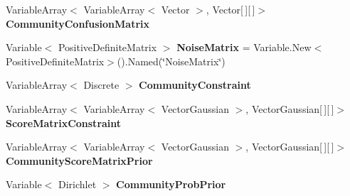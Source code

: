 \begin{DoxyCompactItemize}
\item 
\hypertarget{class_crowdsourcing_models_1_1_c_b_c_c_aa92337a4041cf062fb346a5321c7fa45}{}Variable\+Array$<$ Variable\+Array$<$ Vector $>$, Vector\mbox{[}$\,$\mbox{]}\mbox{[}$\,$\mbox{]}$>$ {\bfseries Community\+Confusion\+Matrix}\label{class_crowdsourcing_models_1_1_c_b_c_c_aa92337a4041cf062fb346a5321c7fa45}

\item 
\hypertarget{class_crowdsourcing_models_1_1_c_b_c_c_a4976a87b7cdd818f300d77d465372238}{}Variable$<$ Positive\+Definite\+Matrix $>$ {\bfseries Noise\+Matrix} = Variable.\+New$<$Positive\+Definite\+Matrix$>$().Named(\char`\"{}Noise\+Matrix\char`\"{})\label{class_crowdsourcing_models_1_1_c_b_c_c_a4976a87b7cdd818f300d77d465372238}

\item 
\hypertarget{class_crowdsourcing_models_1_1_c_b_c_c_a89a575fcd699ce633ed4db7a76f3a076}{}Variable\+Array$<$ Discrete $>$ {\bfseries Community\+Constraint}\label{class_crowdsourcing_models_1_1_c_b_c_c_a89a575fcd699ce633ed4db7a76f3a076}

\item 
\hypertarget{class_crowdsourcing_models_1_1_c_b_c_c_a412e6c94754375c29c6bcee068a9adde}{}Variable\+Array$<$ Variable\+Array$<$ Vector\+Gaussian $>$, Vector\+Gaussian\mbox{[}$\,$\mbox{]}\mbox{[}$\,$\mbox{]}$>$ {\bfseries Score\+Matrix\+Constraint}\label{class_crowdsourcing_models_1_1_c_b_c_c_a412e6c94754375c29c6bcee068a9adde}

\item 
\hypertarget{class_crowdsourcing_models_1_1_c_b_c_c_a87f32bd50b18072b9e8243501b44dd3b}{}Variable\+Array$<$ Variable\+Array$<$ Vector\+Gaussian $>$, Vector\+Gaussian\mbox{[}$\,$\mbox{]}\mbox{[}$\,$\mbox{]}$>$ {\bfseries Community\+Score\+Matrix\+Prior}\label{class_crowdsourcing_models_1_1_c_b_c_c_a87f32bd50b18072b9e8243501b44dd3b}

\item 
\hypertarget{class_crowdsourcing_models_1_1_c_b_c_c_a22ad4228c44dc68dadc00d7fd3428631}{}Variable$<$ Dirichlet $>$ {\bfseries Community\+Prob\+Prior}\label{class_crowdsourcing_models_1_1_c_b_c_c_a22ad4228c44dc68dadc00d7fd3428631}

\end{DoxyCompactItemize}
